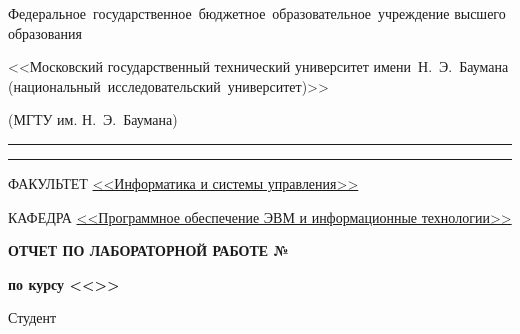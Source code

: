 \begin{titlepage}
\begin{center}
\begin{minipage}{0.85\textwidth}
{                    %
                    {Федеральное~государственное~бюджетное~образовательное~учреждение высшего образования}

                    {<<Московский государственный технический университет имени~Н.~Э.~Баумана (национальный~исследовательский~университет)>>}

                    {(МГТУ им. Н.~Э.~Баумана)}
                    \vspace{0.1cm}
                }
            \end{minipage}

        \vspace{0.2cm}
        \rule{\linewidth}{2.8pt}
        \rule[3ex]{\linewidth}{1pt}

        \begin{flushleft}
            {ФАКУЛЬТЕТ \uline{<<Информатика и системы управления>> \hfill}}

            \vspace{0.5cm}

            {КАФЕДРА \uline{<<Программное обеспечение ЭВМ и информационные технологии>> \hfill}}
        \end{flushleft}

        \vfill

        {
            \Large{\textbf{
                {ОТЧЕТ ПО ЛАБОРАТОРНОЙ РАБОТЕ №\labnumber}
            }}

            \Large{\textbf{
                {по курсу <<\coursename>>}
            }}



            \vspace{0.5cm}
        }

        \vspace{0.5cm}

        \fontsize{14pt}{14pt}\selectfont

        \vfill

        \begin{flushleft}
            {Студент \uline{\myname \hfill}}


\end{flushleft}
\end{center}
\end{titlepage}
